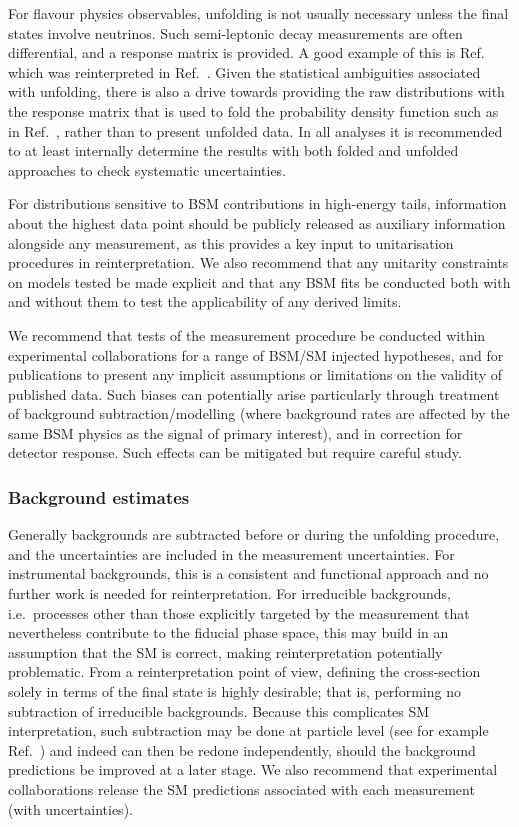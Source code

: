 \documentclass[a4paper,aps,prd,longbibliography,notitlepage,showpacs,amsmath,amssymb,superscriptaddress,nofootinbib,floatfix,11pt,preprintnumbers]{revtex4-1-mod}
\newcommand{\ie}{i.e.\xspace}
\begin{document}
For flavour physics observables, unfolding is not usually necessary unless the
final states involve neutrinos. Such semi-leptonic decay measurements are often differential, and a response matrix is provided. A good example of this is Ref.~\cite{Aaij:2017svr} which was reinterpreted in Ref.~\cite{Bernlochner:2018kxh}. Given the statistical ambiguities associated with unfolding, there is also a drive towards providing the raw distributions with the response matrix that is used to fold the probability density function such as in Ref.~\cite{Abdesselam:2018nnh}, rather than to present unfolded data. In all analyses it is recommended to at least internally determine the results with both folded and unfolded approaches to check systematic uncertainties.

For distributions sensitive to BSM contributions in high-energy tails, information about the highest data point should be publicly released as auxiliary information alongside any measurement, as this provides a key input to unitarisation procedures in reinterpretation. We also recommend that any unitarity constraints on models tested be made explicit and that any BSM fits be conducted both with and without them to test the applicability of any derived limits.

We recommend that tests of the measurement procedure be conducted within experimental collaborations for a range of BSM/SM injected hypotheses, and for publications to present any implicit assumptions or limitations on the validity of published data. Such biases can potentially arise particularly through treatment of background subtraction/modelling (where background rates are affected by the same BSM physics as the signal of primary interest), and in correction for detector response.
Such effects can be mitigated but require careful study.\\

\subsubsection{Background estimates}
Generally backgrounds are subtracted before or during the unfolding procedure, and the uncertainties are included in the measurement uncertainties. For instrumental backgrounds, this is a consistent and functional approach and no further work is needed for reinterpretation. For irreducible backgrounds, \ie~processes other than those explicitly targeted by the measurement that nevertheless contribute to the fiducial phase space, this may build in an assumption that the SM is correct, making reinterpretation potentially problematic. From a reinterpretation point of view, defining the cross-section solely in terms of the final state is highly desirable; that is, performing no subtraction of irreducible backgrounds. Because this complicates SM interpretation, such subtraction may be done at particle level (see for example Ref.~\cite{Aad:2013vka}) and indeed can then be redone independently, should the background predictions be improved at a later stage.
We also recommend that experimental collaborations release the SM predictions associated with each measurement (with uncertainties).
\end{document}
